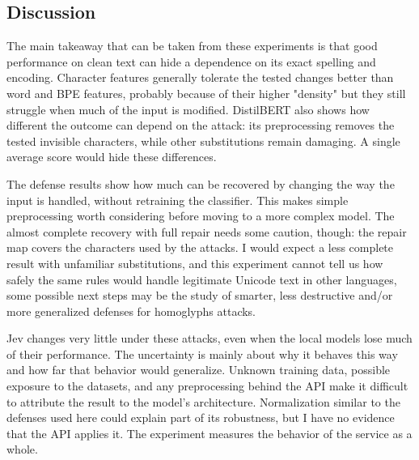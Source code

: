\subsection{Discussion}
The main takeaway that can be taken from these experiments is that good performance on clean text can hide a dependence on its exact spelling and encoding. Character features generally tolerate the tested changes better than word and BPE features, probably because of their higher "density" but they still struggle when much of the input is modified. DistilBERT also shows how different the outcome can depend on the attack: its preprocessing removes the tested invisible characters, while other substitutions remain damaging. A single average score would hide these differences.

The defense results show how much can be recovered by changing the way the input is handled, without retraining the classifier. This makes simple preprocessing worth considering before moving to a more complex model. The almost complete recovery with full repair needs some caution, though: the repair map covers the characters used by the attacks. I would expect a less complete result with unfamiliar substitutions, and this experiment cannot tell us how safely the same rules would handle legitimate Unicode text in other languages, some possible next steps may be the study of smarter, less destructive and/or more generalized defenses for homoglyphs attacks.

Jev changes very little under these attacks, even when the local models lose much of their performance. The uncertainty is mainly about why it behaves this way and how far that behavior would generalize. Unknown training data, possible exposure to the datasets, and any preprocessing behind the API make it difficult to attribute the result to the model's architecture. Normalization similar to the defenses used here could explain part of its robustness, but I have no evidence that the API applies it. The experiment measures the behavior of the service as a whole.


